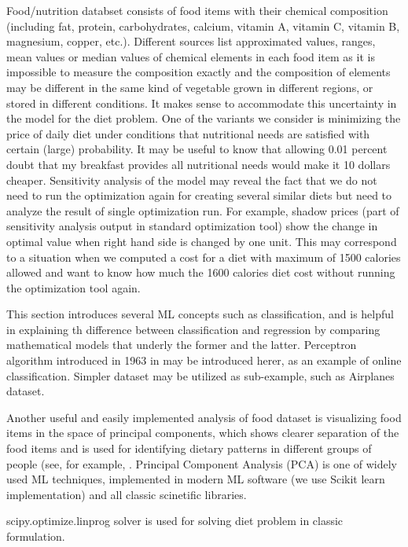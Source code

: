 Food/nutrition databset consists of food items with their chemical composition (including fat, protein, carbohydrates, calcium, vitamin A, vitamin C, vitamin B, magnesium, copper, etc.). Different sources list approximated values, ranges, mean values or median values of chemical elements in each food item as it is impossible to measure the composition exactly and the composition of elements may be different in the same kind of vegetable grown in different regions, or stored in different conditions. It makes sense to accommodate this uncertainty in the model for the diet problem. One of the variants we consider is minimizing the price of daily diet under conditions that nutritional needs are satisfied with certain (large) probability. It may be useful to know that allowing 0.01 percent  doubt that my breakfast provides all nutritional needs would make it 10 dollars  cheaper. 
Sensitivity analysis of the model may reveal the fact that we do not need to run the optimization again for creating several similar diets but need to analyze the result of single optimization run. For example, shadow prices (part of sensitivity analysis output in standard optimization tool) show the change in optimal value when right hand side is changed by one unit. This may correspond to a situation when we computed a cost for a diet with maximum of 1500 calories allowed and want to know how much the 1600 calories diet cost without running the optimization tool again.  


This section introduces several ML concepts such as classification, and is helpful in explaining th difference between classification and regression by comparing mathematical models that underly the former and the latter. Perceptron algorithm introduced in 1963 in \cite{ABR} may be introduced herer, as an example of online classification. Simpler dataset may be utilized as sub-example, such as Airplanes dataset.

Another useful and easily implemented analysis  of food dataset is visualizing food items in the space of principal components,  which shows clearer separation of the food items and is used for identifying dietary patterns in different groups of people (see, for example, \cite{CS}. Principal Component Analysis (PCA) is one of widely used ML techniques, implemented in modern ML software (we use Scikit learn implementation) and all classic scinetific libraries. 

scipy.optimize.linprog solver is used for solving diet problem in classic formulation.


